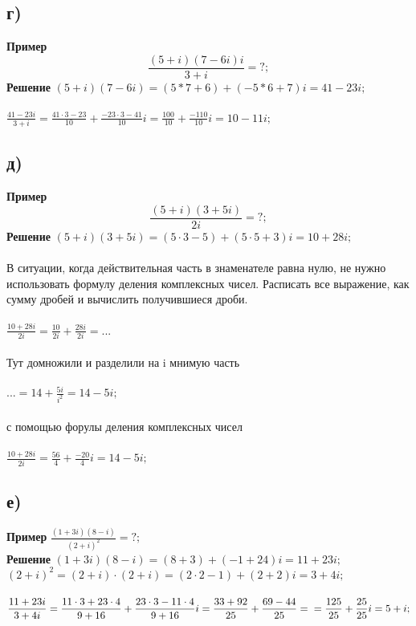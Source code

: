 \documentclass[12pt]{article}
\begin{document}
\newpage
\subsection{г)}
\textbf{Пример}
$$
\frac{(5+i)(7-6i)i}{3+i} = ?;
$$
\textbf{Решение}
$(5+i)(7-6i)=(5*7+6)+(-5*6+7)i=41-23i;$\\
\\
$
\displaystyle
\frac{41-23i}{3+i}=
\frac{41\cdot3-23}{10}+\frac{-23\cdot3-41}{10}i=
\frac{100}{10}+\frac{-110}{10}i=
10-11i;
$

\newpage

\subsection{д)}
\textbf{Пример}
$$
\frac{(5+i)(3+5i)}{2i}=?;
$$
\textbf{Решение}
$(5+i)(3+5i)=(5\cdot3-5)+(5\cdot5 + 3)i=10+28i;$\\
\\
В ситуации, когда действительная часть в знаменателе равна нулю,
не нужно использовать формулу деления комплексных чисел.
Расписать все выражение, как сумму дробей и вычислить получившиеся дроби.\\
\\
$
\displaystyle
\frac{10+28i}{2i}=
\frac{10}{2i}+
\frac{28i}{2i}=...
$\\
\\
Тут домножили и разделили на i мнимую часть\\
\\
$ 
\displaystyle
...=14 + \frac{5i}{i^2} = 14-5i;
$\\
\\
с помощью форулы деления комплексных чисел\\
\\
$
\displaystyle
\frac{10+28i}{2i}=
\frac{56}{4}+
\frac{-20}{4}i=
14-5i;
$


\newpage
\subsection{е)}
\textbf{Пример}
$
\displaystyle
\frac{(1+3i)(8-i)}{(2+i)^2}=?;
$\\
\textbf{Решение}
$
(1+3i)(8-i)=(8+3)+(-1+24)i=11+23i;
$\\
$
(2+i)^2=(2+i)\cdot(2+i)=(2\cdot2-1)+(2+2)i=3+4i;
$\\
\\
$
\displaystyle
\frac{11+23i}{3+4i}=
\frac{11\cdot3+23\cdot4}{9+16}+
\frac{23\cdot3-11\cdot4}{9+16}i=
\frac{33+92}{25}+
\frac{69-44}{25}=\\
=\frac{125}{25}+
\frac{25}{25}i=5+i;
$\\
\end{document}
